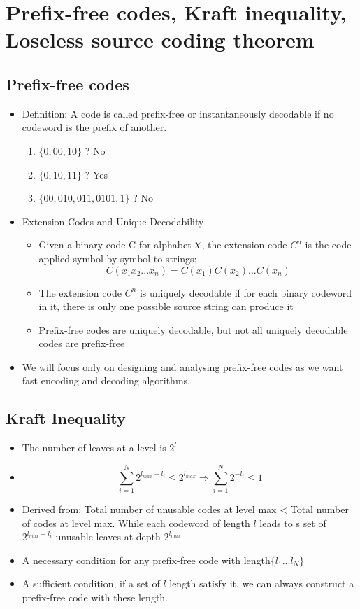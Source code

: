 \documentclass[12pt]{article}
\DeclareRobustCommand{\rchi}{{\mathpalette\irchi\relax}}
\newcommand{\irchi}[2]{\raisebox{\depth}{$#1\chi$}} %
\begin{document}
\section{Prefix-free codes, Kraft inequality, Loseless source coding theorem }
\subsection{Prefix-free codes}
\begin{itemize}
\item Definition: A code is called prefix-free or instantaneously decodable if no codeword is the prefix of another.
\begin{enumerate}
\item $\{0,00,10\}$ ? No
\item $\{0,10,11\}$ ? Yes
\item $\{00,010, 011,0101,1\}$ ? No

\end{enumerate}
\item Extension Codes and Unique Decodability
\begin{itemize}
\item Given a binary code C for alphabet $\rchi$, the extension code $C^n$ is the code applied symbol-by-symbol to strings:
$$C(x_1x_2...x_n) = C(x_1)C(x_2)...C(x_n)$$ 
\item The extension code $C^n$ is uniquely decodable if for each binary codeword in it, there is only one possible source string can produce it 
\item Prefix-free codes are uniquely decodable, but not all uniquely decodable codes are prefix-free
\end{itemize}
\item We will focus only on designing and analysing prefix-free codes as we want fast encoding and decoding algorithms.
\end{itemize}
\subsection{Kraft Inequality}
\begin{itemize}
\item The number of  leaves at a level is $2^l$
\item $$\sum_{i=1}^N 2^{\mathit{l}_{max} - \mathit{l}_i} \le 2^{\mathit{l}_{max}} \Rightarrow \sum_{i=1}^N 2^{ - \mathit{l}_i}  \le 1$$
\item Derived from: Total number of unusable codes at level max < Total number of codes at level max. While each codeword of length $\mathit{l}$ leads to s set of $2^{\mathit{l}_{max} - \mathit{l}_i}$ unusable leaves at depth $2^{\mathit{l}_{max}}$
\item A necessary condition for any prefix-free code with length$\{\mathit{l}_1...\mathit{l}_N \}$ 
\item A sufficient condition, if a set of $\mathit{l}$ length satisfy it, we can always construct a prefix-free code with these length.

\end{itemize}
\end{document}
